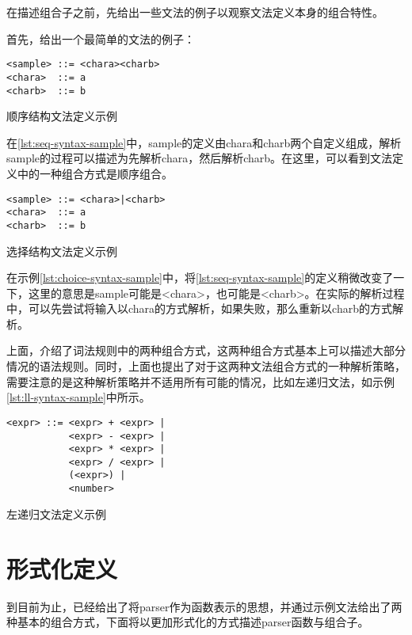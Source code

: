 在描述组合子之前，先给出一些文法的例子以观察文法定义本身的组合特性。

首先，给出一个最简单的文法的例子：

\begin{listing}
\begin{verbatim}
<sample> ::= <chara><charb>
<chara>  ::= a
<charb>  ::= b
\end{verbatim}
\caption{顺序结构文法定义示例}
\label{lst:seq-syntax-sample}
\end{listing}

在\ref{lst:seq-syntax-sample}中，sample的定义由chara和charb两个自定义组成，解析sample的过程可以描述为先解析chara，然后解析charb。在这里，可以看到文法定义中的一种组合方式是顺序组合。

\begin{listing}
\begin{verbatim}
<sample> ::= <chara>|<charb>
<chara>  ::= a
<charb>  ::= b
\end{verbatim}
\caption{选择结构文法定义示例}
\label{lst:choice-syntax-sample}
\end{listing}

在示例\ref{lst:choice-syntax-sample}中，将\ref{lst:seq-syntax-sample}的定义稍微改变了一下，这里的意思是sample可能是<chara>，也可能是<charb>。在实际的解析过程中，可以先尝试将输入以chara的方式解析，如果失败，那么重新以charb的方式解析。

上面，介绍了词法规则中的两种组合方式，这两种组合方式基本上可以描述大部分情况的语法规则。同时，上面也提出了对于这两种文法组合方式的一种解析策略，需要注意的是这种解析策略并不适用所有可能的情况，比如左递归文法，如示例\ref{lst:ll-syntax-sample}中所示。

\begin{listing}
\begin{verbatim}
<expr> ::= <expr> + <expr> |
           <expr> - <expr> |
           <expr> * <expr> |
           <expr> / <expr> |
           (<expr>) |
           <number>
\end{verbatim}
\caption{左递归文法定义示例}
\label{lst:ll-syntax-sample}
\end{listing}

\section{形式化定义}

到目前为止，已经给出了将parser作为函数表示的思想，并通过示例文法给出了两种基本的组合方式，下面将以更加形式化的方式描述parser函数与组合子。

